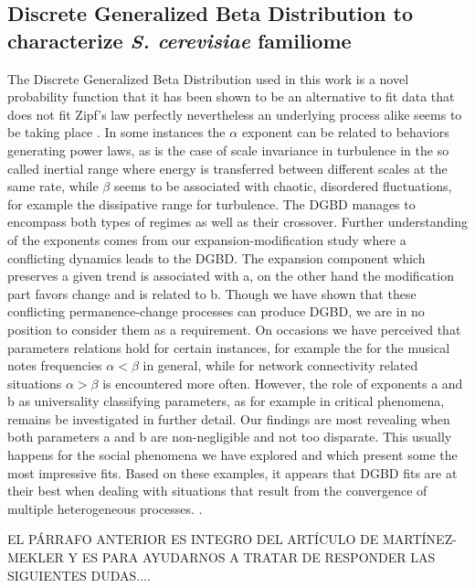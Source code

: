 \documentclass[preprint,12pt]{elsarticle}
\begin{document}
\bigbreak

\subsection{Discrete Generalized Beta Distribution to characterize {\it S. cerevisiae} familiome}
The Discrete Generalized Beta Distribution used in this work is 
a novel probability function that it has been shown to be an
alternative to fit data that does not fit Zipf's law perfectly
nevertheless an underlying process alike seems to be taking 
place \cite{martinez2009universality, fontanelli2016beyondzipf}. 
In some instances the $\alpha$ exponent can be related 
to behaviors generating power laws, as is the case of scale invariance in turbulence in the so called 
inertial range where energy is transferred between different scales 
at the same rate, while $\beta$ seems to be associated with chaotic, 
disordered fluctuations, for example the dissipative range for 
turbulence. 
The DGBD manages to encompass both types of regimes as well as 
their crossover. Further understanding of the exponents comes 
from our expansion-modification study where a conflicting dynamics 
leads to the DGBD. The expansion component which preserves a given 
trend is associated with a, on the other hand the modification part 
favors change and is related to b. Though we have shown that these 
conflicting permanence-change processes can produce DGBD, we are in 
no position to consider them as a requirement. On occasions we have 
perceived that parameters relations hold for certain instances, for 
example the for the musical notes frequencies $\alpha < \beta$ in 
general, while for network connectivity related situations $\alpha > \beta $ 
is encountered more often. However, the role of exponents a and b 
as universality classifying parameters, as for example in critical 
phenomena, remains be investigated in further detail. 
Our findings are most revealing when both parameters a and b are 
non-negligible and not too disparate. This usually happens for the 
social phenomena we have explored and which present some the most 
impressive fits. Based on these examples, it appears that DGBD fits 
are at their best when dealing with situations that result from the 
convergence of multiple heterogeneous processes. \cite{martinez2009universality}. \par 

EL PÁRRAFO ANTERIOR ES INTEGRO DEL ARTÍCULO DE MARTÍNEZ-MEKLER Y ES 
PARA AYUDARNOS A TRATAR DE RESPONDER LAS SIGUIENTES DUDAS.... \par 
\end{document}
